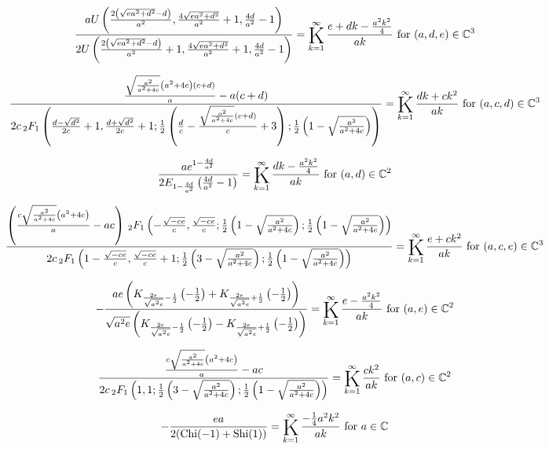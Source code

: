\documentclass{article}
\newcommand{\bigK}{\mathop{\raisebox{-5pt}{\huge K}}}
\begin{document}
\[\frac{a U\left(\frac{2 \left(\sqrt{e a^2+d^2}-d\right)}{a^2},\frac{4 \sqrt{e a^2+d^2}}{a^2}+1,\frac{4 d}{a^2}-1\right)}{2 U\left(\frac{2 \left(\sqrt{e a^2+d^2}-d\right)}{a^2}+1,\frac{4 \sqrt{e a^2+d^2}}{a^2}+1,\frac{4 d}{a^2}-1\right)}=\bigK_{k=1}^{\infty}\frac{e+d k-\frac{a^2 k^2}{4}}{a k}\text{ for }(a,d,e)\in \mathbb{C}^3\] 

\[\frac{\frac{\sqrt{\frac{a^2}{a^2+4 c}} \left(a^2+4 c\right) (c+d)}{a}-a (c+d)}{2 c \, _2F_1\left(\frac{d-\sqrt{d^2}}{2 c}+1,\frac{d+\sqrt{d^2}}{2 c}+1;\frac{1}{2} \left(\frac{d}{c}-\frac{\sqrt{\frac{a^2}{a^2+4 c}} (c+d)}{c}+3\right);\frac{1}{2} \left(1-\sqrt{\frac{a^2}{a^2+4 c}}\right)\right)}=\bigK_{k=1}^{\infty}\frac{d k+c k^2}{a k}\text{ for }(a,c,d)\in \mathbb{C}^3\] 

\[\frac{a e^{1-\frac{4 d}{a^2}}}{2 E_{1-\frac{4 d}{a^2}}\left(\frac{4 d}{a^2}-1\right)}=\bigK_{k=1}^{\infty}\frac{d k-\frac{a^2 k^2}{4}}{a k}\text{ for }(a,d)\in \mathbb{C}^2\] 

\[\frac{\left(\frac{c \sqrt{\frac{a^2}{a^2+4 c}} \left(a^2+4 c\right)}{a}-a c\right) \, _2F_1\left(-\frac{\sqrt{-c e}}{c},\frac{\sqrt{-c e}}{c};\frac{1}{2} \left(1-\sqrt{\frac{a^2}{a^2+4 c}}\right);\frac{1}{2} \left(1-\sqrt{\frac{a^2}{a^2+4 c}}\right)\right)}{2 c \, _2F_1\left(1-\frac{\sqrt{-c e}}{c},\frac{\sqrt{-c e}}{c}+1;\frac{1}{2} \left(3-\sqrt{\frac{a^2}{a^2+4 c}}\right);\frac{1}{2} \left(1-\sqrt{\frac{a^2}{a^2+4 c}}\right)\right)}=\bigK_{k=1}^{\infty}\frac{e+c k^2}{a k}\text{ for }(a,c,e)\in \mathbb{C}^3\] 

\[-\frac{a e \left(K_{\frac{2 e}{\sqrt{a^2 e}}-\frac{1}{2}}\left(-\frac{1}{2}\right)+K_{\frac{2 e}{\sqrt{a^2 e}}+\frac{1}{2}}\left(-\frac{1}{2}\right)\right)}{\sqrt{a^2 e} \left(K_{\frac{2 e}{\sqrt{a^2 e}}-\frac{1}{2}}\left(-\frac{1}{2}\right)-K_{\frac{2 e}{\sqrt{a^2 e}}+\frac{1}{2}}\left(-\frac{1}{2}\right)\right)}=\bigK_{k=1}^{\infty}\frac{e-\frac{a^2 k^2}{4}}{a k}\text{ for }(a,e)\in \mathbb{C}^2\] 

\[\frac{\frac{c \sqrt{\frac{a^2}{a^2+4 c}} \left(a^2+4 c\right)}{a}-a c}{2 c \, _2F_1\left(1,1;\frac{1}{2} \left(3-\sqrt{\frac{a^2}{a^2+4 c}}\right);\frac{1}{2} \left(1-\sqrt{\frac{a^2}{a^2+4 c}}\right)\right)}=\bigK_{k=1}^{\infty}\frac{c k^2}{a k}\text{ for }(a,c)\in \mathbb{C}^2\] 

\[-\frac{e a}{2 (\text{Chi}(-1)+\text{Shi}(1))}=\bigK_{k=1}^{\infty}\frac{-\frac{1}{4} a^2 k^2}{a k}\text{ for }a\in \mathbb{C}\] 
\end{document}
